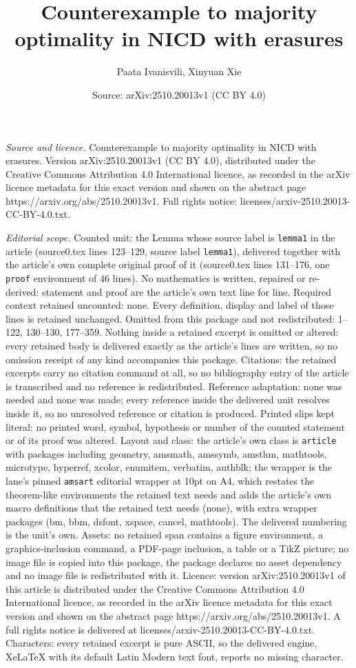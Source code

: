 \documentclass[10pt,a4paper]{amsart}
\title[Counterexample to majority optimality in NICD with erasures]{Counterexample to majority optimality in NICD with erasures}
\author{Paata Ivanisvili, Xinyuan Xie}
\date{Source: arXiv:2510.20013v1 (CC BY 4.0)}
\begin{document}
\maketitle

\noindent\emph{Source and licence.} Counterexample to majority optimality in NICD with erasures. Version arXiv:2510.20013v1 (CC BY 4.0), distributed under the Creative Commons Attribution 4.0 International licence, as recorded in the arXiv licence metadata for this exact version and shown on the abstract page https://arxiv.org/abs/2510.20013v1. Full rights notice: licenses/arxiv-2510.20013-CC-BY-4.0.txt.\par\smallskip

\noindent\textit{Editorial scope.} Counted unit: the Lemma whose source label is \texttt{lemma1} in the article (source0.tex lines 123--129, source label \texttt{lemma1}), delivered together with the article's own complete original proof of it (source0.tex lines 131--176, one \texttt{proof} environment of 46 lines). No mathematics is written, repaired or re-derived: statement and proof are the article's own text line for line. Required context retained uncounted: none. Every definition, display and label of those lines is retained unchanged. Omitted from this package and not redistributed: 1--122, 130--130, 177--359. Nothing inside a retained excerpt is omitted or altered: every retained body is delivered exactly as the article's lines are written, so no omission receipt of any kind accompanies this package. Citations: the retained excerpts carry no citation command at all, so no bibliography entry of the article is transcribed and no reference is redistributed. Reference adaptation: none was needed and none was made; every reference inside the delivered unit resolves inside it, so no unresolved reference or citation is produced. Printed slips kept literal: no printed word, symbol, hypothesis or number of the counted statement or of its proof was altered. Layout and class: the article's own class is \texttt{article} with packages including geometry, amsmath, amssymb, amsthm, mathtools, microtype, hyperref, xcolor, enumitem, verbatim, authblk; the wrapper is the lane's pinned \texttt{amsart} editorial wrapper at 10pt on A4, which restates the theorem-like environments the retained text needs and adds the article's own macro definitions that the retained text needs (none), with extra wrapper packages (bm, bbm, dsfont, xspace, cancel, mathtools). The delivered numbering is the unit's own. Assets: no retained span contains a figure environment, a graphics-inclusion command, a PDF-page inclusion, a table or a TikZ picture; no image file is copied into this package, the package declares no asset dependency and no image file is redistributed with it. Licence: version arXiv:2510.20013v1 of this article is distributed under the Creative Commons Attribution 4.0 International licence, as recorded in the arXiv licence metadata for this exact version and shown on the abstract page https://arxiv.org/abs/2510.20013v1. A full rights notice is delivered at licenses/arxiv-2510.20013-CC-BY-4.0.txt. Characters: every retained excerpt is pure ASCII, so the delivered engine, XeLaTeX with its default Latin Modern text font, reports no missing character.
\end{document}
